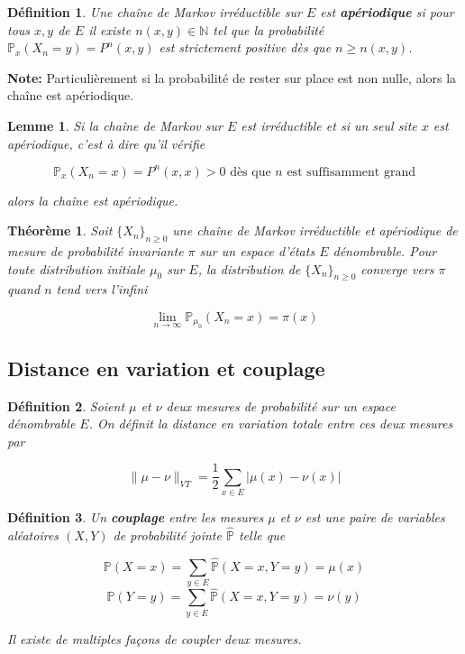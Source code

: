 \documentclass[10pt,a4paper,oneside]{article}
\newtheorem{theoreme}{Théorème}
\newtheorem{lemme}{Lemme}
\newtheorem{definition}{Définition}
\begin{document}
\begin{definition}
Une chaîne de Markov irréductible sur $E$ est \textbf{apériodique} si pour tous $x,y$ de $E$ il existe $n(x,y) \in \mathbb{N}$ tel que la probabilité $\mathbb{P}_x(X_n = y) = P^n(x,y)$ est strictement positive dès que $n \geq n(x,y)$.
\end{definition}

\textbf{Note:} Particulièrement si la probabilité de rester sur place est non nulle, alors la chaîne est apériodique.

\begin{lemme}
Si la chaîne de Markov sur $E$ est irréductible et si un seul site $x$ est apériodique, c'est à dire qu'il vérifie

\[ \mathbb{P}_x(X_n = x) = P^n(x,x) > 0 \text{ dès que }n\text{ est suffisamment grand} \]

alors la chaîne est apériodique.
\end{lemme}

\begin{theoreme}
Soit $\{ X_n \}_{n \geq 0}$ une chaîne de Markov irréductible et apériodique de mesure de probabilité invariante $\pi$ sur un espace d'états $E$ dénombrable. Pour toute distribution initiale $\mu_0$ sur $E$, la distribution de $\{ X_n \}_{n \geq 0}$ converge vers $\pi$ quand $n$ tend vers l'infini

\[ \lim_{n \to \infty} \mathbb{P}_{\mu_0}(X_n = x) = \pi(x) \]
\end{theoreme}

\subsection{Distance en variation et couplage}

\begin{definition}
Soient $\mu$ et $\nu$ deux mesures de probabilité sur un espace dénombrable $E$. On définit la distance en variation totale entre ces deux mesures par

\[ \| \mu - \nu \|_{VT} = \frac{1}{2} \sum_{x \in E} |\mu(x) - \nu(x)| \]
\end{definition}

\begin{definition}
Un \textbf{couplage} entre les mesures $\mu$ et $\nu$ est une paire de variables aléatoires $(X,Y)$ de probabilité jointe $\widehat{\mathbb{P}}$ telle que

\[ \mathbb{P}(X = x) = \sum_{y \in E} \widehat{\mathbb{P}}(X = x,Y = y) = \mu(x) \]
\[ \mathbb{P}(Y = y) = \sum_{y \in E} \widehat{\mathbb{P}}(X = x,Y = y) = \nu(y) \]

Il existe de multiples façons de coupler deux mesures.
\end{definition}
\end{document}

